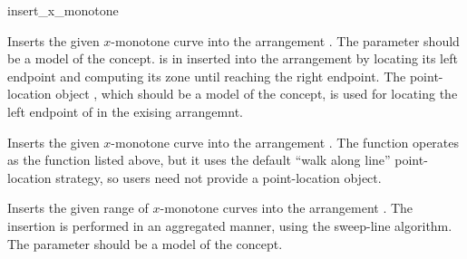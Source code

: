 
\ccRefPageBegin

\begin{ccRefFunction}{insert_x_monotone}


   {Inserts the given $x$-monotone curve  into the arrangement
    . The  parameter should be a model of the
     concept.  is in inserted
    into the arrangement by locating its left endpoint and computing its
    zone until reaching the right endpoint.
    The point-location object , which should be a model of the
     concept, is used for locating the
    left endpoint of  in the exising arrangemnt.
    }

   {Inserts the given $x$-monotone curve  into the arrangement
    . The function operates as the function listed above, but it
    uses the default ``walk along line'' point-location strategy, so users
    need not provide a point-location object.}

   {Inserts the given range of $x$-monotone curves \ccc{[first,last)}
    into the arrangement . The insertion is performed in an aggregated
    manner, using the sweep-line algorithm. The  parameter should
    be a model of the  concept.
    }

\end{ccRefFunction}

\ccRefPageEnd
